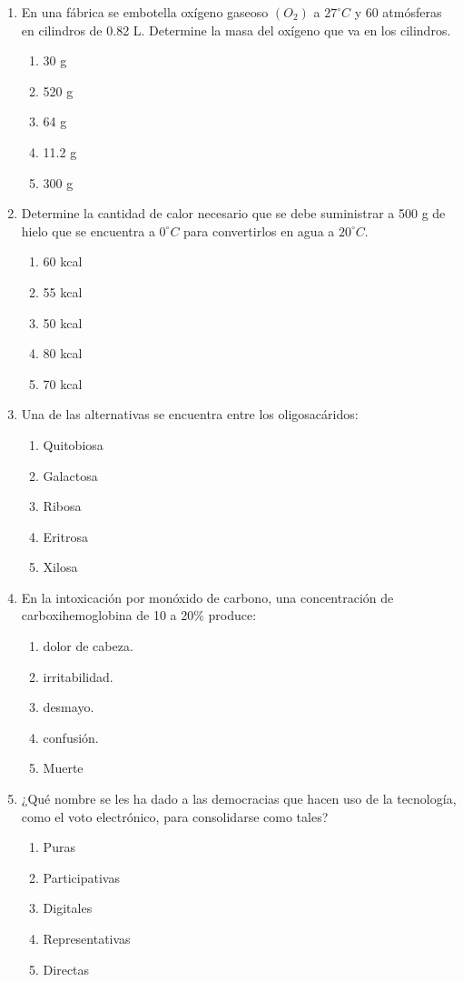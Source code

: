 \begin{enumerate}
	\item En una fábrica se embotella oxígeno gaseoso $(O_2)$ a $27^\circ C$ y 60 atmósferas en cilindros de 0.82 L. Determine la masa del oxígeno que va en los cilindros.
	\begin{enumerate}[label=\alph*)]
		\item 30 g
		\item 520 g
		\item 64 g
		\item 11.2 g
		\item 300 g
	\end{enumerate}

	\item Determine la cantidad de calor necesario que se debe suministrar a 500 g de hielo que se encuentra a $0^\circ C$ para convertirlos en agua a $20^\circ C$.
	\begin{enumerate}[label=\alph*)]
		\item 60 kcal
		\item 55 kcal
		\item 50 kcal
		\item 80 kcal
		\item 70 kcal
	\end{enumerate}

	\item Una de las alternativas se encuentra entre los oligosacáridos:
	\begin{enumerate}[label=\alph*)]
		\item Quitobiosa
		\item Galactosa
		\item Ribosa
		\item Eritrosa
		\item Xilosa
	\end{enumerate}

	\item En la intoxicación por monóxido de carbono, una concentración de carboxihemoglobina de 10 a 20\% produce:
	\begin{enumerate}[label=\alph*)]
		\item dolor de cabeza.
		\item irritabilidad.
		\item desmayo.
		\item confusión.
		\item Muerte
	\end{enumerate}

	\item ¿Qué nombre se les ha dado a las democracias que hacen uso de la tecnología, como el voto electrónico, para consolidarse como tales?
	\begin{enumerate}[label=\alph*)]
		\item Puras
		\item Participativas
		\item Digitales
		\item Representativas
		\item Directas
	\end{enumerate}


\end{enumerate}
